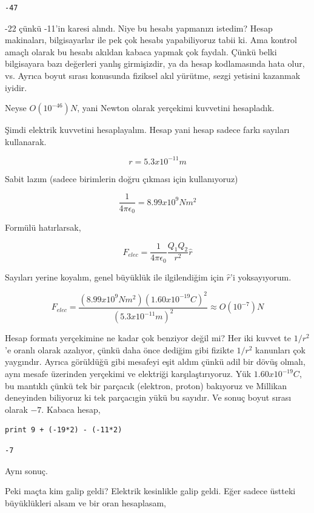 \documentclass[12pt,fleqn]{article}\usepackage{../../common}
\begin{document}
\begin{verbatim}
-47
\end{verbatim}

-22 çünkü -11'in karesi alındı. Niye bu hesabı yapmanızı istedim? Hesap
makinaları, bilgisayarlar ile pek çok hesabı yapabiliyoruz tabii ki. Ama
kontrol amaçlı olarak bu hesabı akıldan kabaca yapmak çok faydalı. Çünkü
belki bilgisayara bazı değerleri yanlış girmişizdir, ya da hesap
kodlamasında hata olur, vs. Ayrıca boyut sırası konusunda fiziksel akıl
yürütme, sezgi yetisini kazanmak iyidir.

Neyse $O(10^{-46}) N$, yani Newton olarak yerçekimi kuvvetini hesapladık.

Şimdi elektrik kuvvetini hesaplayalım. Hesap yani hesap sadece farkı sayıları
kullanarak.

$$ r = 5.3 x 10^{-11} m $$

Sabit lazım (sadece birimlerin doğru çıkması için kullanıyoruz)

$$ \frac{1}{4\pi \epsilon_0} = 8.99 x 10^{9} Nm^2$$

Formülü hatırlarsak,

$$ F_{elec} =
\frac{1}{4\pi \epsilon_0}
\frac{Q_1 Q_2}{r^2} \hat{r}
$$

Sayıları yerine koyalım, genel büyüklük ile ilgilendiğim için $\hat{r}$'i
yoksayıyorum. 

$$ F_{elec} =
\frac{(8.99 x 10^{9} Nm^2) (1.60 x 10^{-19} C)^2  }{ (5.3 x 10^{-11} m )^2  }
\approx O(10^{-7}) N
$$

Hesap formatı yerçekimine ne kadar çok benziyor değil mi? Her iki kuvvet te
$1/r^2$'e oranlı olarak azalıyor, çünkü daha önce dediğim gibi fizikte
$1/r^2$ kanunları çok yaygındır. Ayrıca görüldüğü gibi mesafeyi eşit aldım
çünkü adil bir dövüş olmalı, aynı mesafe üzerinden yerçekimi ve elektriği
karşılaştırıyoruz. Yük $1.60 x 10^{-19} C$, bu mantıklı çünkü tek bir
parçacık (elektron, proton) bakıyoruz ve Millikan deneyinden biliyoruz ki
tek parçacıgin yükü bu sayıdır. Ve sonuç boyut sırası olarak $-7$. Kabaca
hesap,

\begin{verbatim}
print 9 + (-19*2) - (-11*2) 
\end{verbatim}

\begin{verbatim}
-7
\end{verbatim}

Aynı sonuç.

Peki maçta kim galip geldi? Elektrik kesinlikle galip geldi. Eğer sadece üstteki
büyüklükleri alsam ve bir oran hesaplasam,
\end{document}
